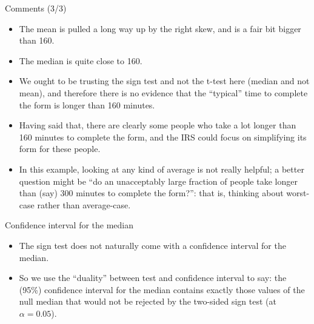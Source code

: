 \documentclass[
  ignorenonframetext,
]{beamer}
\providecommand{\tightlist}{%
  \setlength{\itemsep}{0pt}\setlength{\parskip}{0pt}}
\begin{document}
\begin{frame}{Comments (3/3)}
\protect\hypertarget{comments-33}{}

\begin{itemize}
\tightlist
\item
  The mean is pulled a long way up by the right skew, and is a fair bit
  bigger than 160.
\item
  The median is quite close to 160.
\item
  We ought to be trusting the sign test and not the t-test here (median
  and not mean), and therefore there is no evidence that the ``typical''
  time to complete the form is longer than 160 minutes.
\item
  Having said that, there are clearly some people who take a lot longer
  than 160 minutes to complete the form, and the IRS could focus on
  simplifying its form for these people.
\item
  In this example, looking at any kind of average is not really helpful;
  a better question might be ``do an unacceptably large fraction of
  people take longer than (say) 300 minutes to complete the form?'':
  that is, thinking about worst-case rather than average-case.
\end{itemize}

\end{frame}

\begin{frame}{Confidence interval for the median}
\protect\hypertarget{confidence-interval-for-the-median}{}

\begin{itemize}
\tightlist
\item
  The sign test does not naturally come with a confidence interval for
  the median.
\item
  So we use the ``duality'' between test and confidence interval to say:
  the (95\%) confidence interval for the median contains exactly those
  values of the null median that would not be rejected by the two-sided
  sign test (at \(\alpha = 0.05\)).
\end{itemize}

\end{frame}
\end{document}
